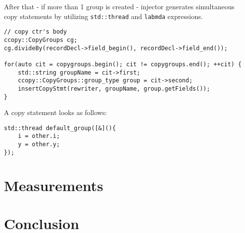 \documentclass{article}
\begin{document}
After that - if more than 1 group is created - injector generates simultaneous copy statements by utilizing \texttt{std::thread} and \texttt{labmda} expressions.

\begin{verbatim}
// copy ctr's body
ccopy::CopyGroups cg;
cg.divideBy(recordDecl->field_begin(), recordDecl->field_end());

for(auto cit = copygroups.begin(); cit != copygroups.end(); ++cit) {
    std::string groupName = cit->first;
    ccopy::CopyGroups::group_type group = cit->second;
    insertCopyStmt(rewriter, groupName, group.getFields());         
}
\end{verbatim}
A copy statement looks as follows:
\begin{verbatim}
std::thread default_group([&](){
    i = other.i;
    y = other.y;
});
\end{verbatim}

\section{Measurements}
\label{measurements}

\section{Conclusion}
\label{conc}
\end{document}
